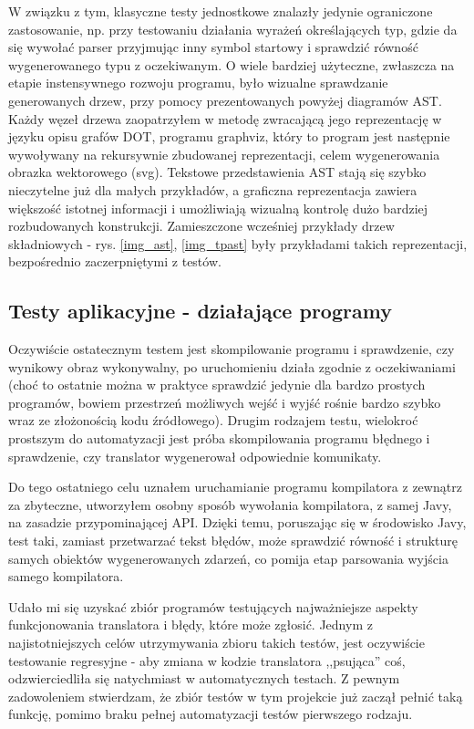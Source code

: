 W związku z tym, klasyczne testy jednostkowe znalazły jedynie ograniczone zastosowanie, np. przy testowaniu działania wyrażeń określających typ, gdzie da się wywołać parser przyjmując inny symbol startowy i sprawdzić równość wygenerowanego typu z oczekiwanym. O wiele bardziej użyteczne, zwłaszcza na etapie instensywnego rozwoju programu, było wizualne sprawdzanie generowanych drzew, przy pomocy prezentowanych powyżej diagramów AST. Każdy węzeł drzewa zaopatrzyłem w metodę zwracającą jego reprezentację w języku opisu grafów DOT, programu graphviz, który to program jest następnie wywoływany na rekursywnie zbudowanej reprezentacji, celem wygenerowania obrazka wektorowego (svg). Tekstowe przedstawienia AST stają się szybko nieczytelne już dla małych przykładów, a graficzna reprezentacja zawiera większość istotnej informacji i umożliwiają wizualną kontrolę dużo bardziej rozbudowanych konstrukcji. Zamieszczone wcześniej przykłady drzew składniowych - rys. \ref{img_ast}, \ref{img_tpast} były przykładami takich reprezentacji, bezpośrednio zaczerpniętymi z testów.

\subsection{Testy aplikacyjne - działające programy}
Oczywiście ostatecznym testem jest skompilowanie programu i sprawdzenie, czy wynikowy obraz wykonywalny, po uruchomieniu działa zgodnie z oczekiwaniami (choć to ostatnie można w praktyce sprawdzić jedynie dla bardzo prostych programów, bowiem przestrzeń możliwych wejść i wyjść rośnie bardzo szybko wraz ze złożonością kodu źródłowego). Drugim rodzajem testu, wielokroć prostszym do automatyzacji jest próba skompilowania programu błędnego i sprawdzenie, czy translator wygenerował odpowiednie komunikaty.

Do tego ostatniego celu uznałem uruchamianie programu kompilatora z zewnątrz za zbyteczne, utworzyłem osobny sposób wywołania kompilatora, z samej Javy, na zasadzie przypominającej API. Dzięki temu, poruszając się w środowisko Javy, test taki, zamiast przetwarzać tekst błędów, może sprawdzić równość i strukturę samych obiektów wygenerowanych zdarzeń, co pomija etap parsowania wyjścia samego kompilatora.

Udało mi się uzyskać zbiór programów testujących najważniejsze aspekty funkcjonowania translatora i błędy, które może zgłosić. Jednym z najistotniejszych celów utrzymywania zbioru takich testów, jest oczywiście testowanie regresyjne - aby zmiana w kodzie translatora ,,psująca'' coś, odzwierciedliła się natychmiast w automatycznych testach. Z pewnym zadowoleniem stwierdzam, że zbiór testów w tym projekcie już zaczął pełnić taką funkcję, pomimo braku pełnej automatyzacji testów pierwszego rodzaju.

